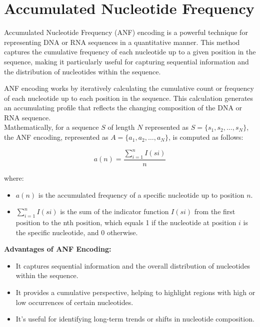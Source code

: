 \section{Accumulated Nucleotide Frequency}

Accumulated Nucleotide Frequency (ANF) encoding is a powerful technique for
representing DNA or RNA sequences in a quantitative manner. This method captures
the cumulative frequency of each nucleotide up to a given position in the sequence,
making it particularly useful for capturing sequential information and the
distribution of nucleotides within the sequence.

ANF encoding works by iteratively calculating the cumulative count or frequency
of each nucleotide up to each position in the sequence. This calculation generates
an accumulating profile that reflects the changing composition of the DNA or RNA
sequence.\\

\noindent
Mathematically, for a sequence $S$ of length $N$ represented as
$S = \{s_1, s_2, \ldots, s_N\}$, the ANF encoding, represented as 
$A = \{a_1, a_2, \ldots, a_N\}$, is computed as follows:

\begin{equation}
  a(n) = \frac{\sum_{i=1}^{n} I(si)}{n}
\end{equation}

\noindent
where:
\begin{itemize}
  \item $a(n)$ is the accumulated frequency of a specific nucleotide up to position $n$.
  \item $\sum_{i=1}^{n} I(si)$ is the sum of the indicator function $I(si)$ from
  the first position to the nth position, which equals 1 if the nucleotide at
  position $i$ is the specific nucleotide, and $0$ otherwise.
\end{itemize}

\noindent
\textbf{Advantages of ANF Encoding:}
\begin{itemize}
  \item It captures sequential information and the overall distribution of
  nucleotides within the sequence.
  \item It provides a cumulative perspective, helping to highlight regions with
  high or low occurrences of certain nucleotides.
  \item It's useful for identifying long-term trends or shifts in nucleotide
  composition.
\end{itemize}

